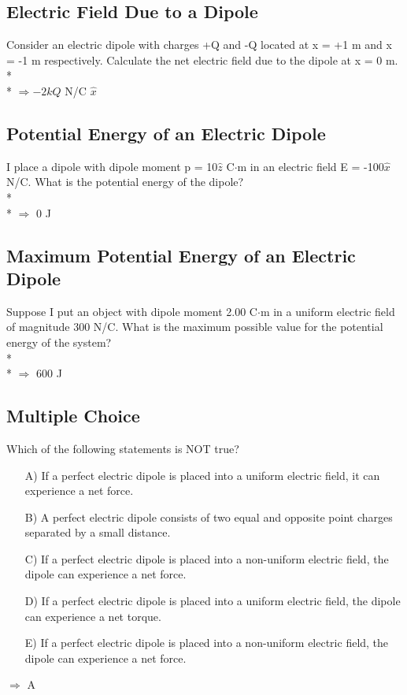 \documentclass[11pt]{article}
\begin{document}
\subsection{Electric Field Due to a Dipole}
Consider an electric dipole with charges +Q and -Q located at x = +1 m and x = -1 m respectively.  Calculate the net electric field due to the dipole at x = 0 m. \\* \\*
$\Rightarrow -2kQ$ N/C $\hat{x}$

\subsection{Potential Energy of an Electric Dipole}
I place a dipole with dipole moment p = 10$\hat{z}$ C$\cdot$m in an electric field E = -100$\hat{x}$ N/C.  What is the potential energy of the dipole? \\* \\*
$\Rightarrow$ 0 J

\subsection{Maximum Potential Energy of an Electric Dipole}
Suppose I put an object with dipole moment 2.00 C$\cdot$m in a uniform electric field of magnitude 300 N/C.  What is the maximum possible value for the potential energy of the system? \\* \\*
$\Rightarrow$ 600 J

\subsection{Multiple Choice}
Which of the following statements is NOT true?

\begin{itemize}
	\item[A)] If a perfect electric dipole is placed into a uniform electric field, it can experience a net force.
	\item[B)] A perfect electric dipole consists of two equal and opposite point charges separated by a small distance.
	\item[C)] If a perfect electric dipole is placed into a non-uniform electric field, the dipole can experience a net force.
	\item[D)] If a perfect electric dipole is placed into a uniform electric field, the dipole can experience a net torque.
	\item[E)] If a perfect electric dipole is placed into a non-uniform electric field, the dipole can experience a net force.
\end{itemize}
$\Rightarrow$ A
\end{document}
